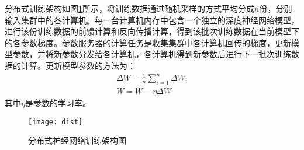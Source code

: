 分布式训练架构如图\ref{fig:dist}所示，将训练数据通过随机采样的方式平均分成$n$份，分别输入集群中的各计算机。每一台计算机内存中包含一个独立的深度神经网络模型，进行该份训练数据的前馈计算和反向传播计算，得到该批次训练数据在当前模型下的各参数梯度。参数服务器的计算任务是收集集群中各计算机回传的梯度，更新模型参数，并将新参数分发给各计算机，各计算机得到新参数后进行下一批次训练数据的计算。更新模型参数的方法为：
\begin{eqnarray}
\Delta W=\frac{1}{n}\sum_{i = 1}^{n}\Delta W_i \\
W=W-\eta\Delta W
\end{eqnarray}
其中$\eta$是参数的学习率。

\begin{figure}[!htb]
\centering
\texttt{[image: dist]}
\caption{分布式神经网络训练架构图}
\label{fig:dist}
\end{figure}